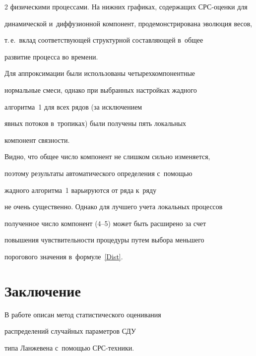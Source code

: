 \begin{multicols}{2}
  физическими процессами. На нижних графиках, содержащих СРС-оцен\-ки для 

  динамической и~диффузионной компонент, продемонстрирована эволюция весов, 

  т.\,е.\ вклад соответствующей структурной со\-став\-ля\-ющей в~общее 

  развитие процесса во времени.



Для аппроксимации были использованы четырехкомпонентные 

нормальные смеси, однако при выбранных настройках жад\-но\-го 

алгоритма~1 для всех рядов (за исключением

 явных потоков в~тропиках) были получены пять локальных

  компонент связ\-ности.





Видно, что общее чис\-ло компонент не слишком сильно изменяется, 

поэтому результаты автоматического определения с~по\-мощью 

жад\-но\-го алгоритма~1 варьируются от ряда к~ряду 

не очень существенно. Однако для лучшего учета локальных процессов 

полученное чис\-ло компонент (4--5) может быть расширено за счет 

повышения чув\-ст\-ви\-тель\-ности процедуры путем выбора меньшего 

порогового значения в~формуле~\eqref{Dist}.



\vspace*{-9pt}



\section{Заключение}

\vspace*{-3pt}



В работе описан метод статистического оценивания 

распределений случайных па\-ра\-мет\-ров СДУ


типа Ланжевена с~по\-мощью СРС-техники.



\end{multicols}
